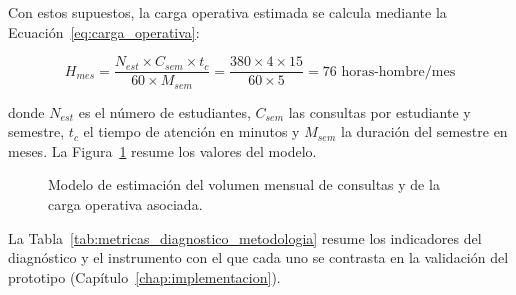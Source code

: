 Con estos supuestos, la carga operativa estimada se calcula mediante la Ecuación~\ref{eq:carga_operativa}:

\begin{equation}
\label{eq:carga_operativa}
H_{mes} = \frac{N_{est} \times C_{sem} \times t_{c}}{60 \times M_{sem}} = \frac{380 \times 4 \times 15}{60 \times 5} = 76 \text{ horas-hombre/mes}
\end{equation}

donde $N_{est}$ es el número de estudiantes, $C_{sem}$ las consultas por estudiante y semestre, $t_c$ el tiempo de atención en minutos y $M_{sem}$ la duración del semestre en meses. La Figura~\ref{fig:estadisticas_consultas} resume los valores del modelo.

\begin{figure}[htbp]
\centering
{}
\caption{Modelo de estimación del volumen mensual de consultas y de la carga operativa asociada.}
\label{fig:estadisticas_consultas}
\elaboradopor{\autorTFG}
\end{figure}

La Tabla~\ref{tab:metricas_diagnostico_metodologia} resume los indicadores del diagnóstico y el instrumento con el que cada uno se contrasta en la validación del prototipo (Capítulo~\ref{chap:implementacion}).

